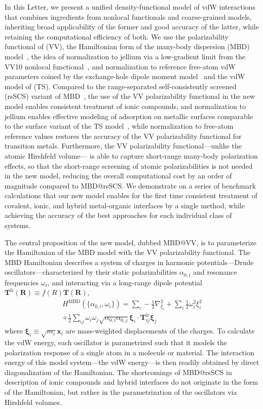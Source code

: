 In this Letter, we present a unified density-functional model of vdW interactions that combines ingredients from nonlocal functionals and coarse-grained models, inheriting broad applicability of the former and good accuracy of the latter, while retaining the computational efficiency of both.
We use the polarizability functional of \citet{VydrovPRA10} (VV), the Hamiltonian form of the many-body dispersion (MBD) model~\citep{TkatchenkoJCP13}, the idea of normalization to jellium via a low-gradient limit from the VV10 nonlocal functional~\citep{VydrovJCP10a}, and normalization to reference free-atom vdW parameters coined by the exchange-hole dipole moment model~\citep{BeckeJCP06} and the vdW model of \citet{TkatchenkoPRL09} (TS).
Compared to the range-separated self-consistently screened (rsSCS) variant of MBD~\citep{AmbrosettiJCP14}, the use of the VV polarizability functional in the new model enables consistent treatment of ionic compounds, and normalization to jellium enables effective modeling of adsorption on metallic surfaces comparable to the surface variant of the TS model~\cite{RuizPRL12}, while normalization to free-atom reference values restores the accuracy of the VV polarizability functional for transition metals.
Furthermore, the VV polarizability functional---unlike the atomic Hirshfeld volume---
is able to capture short-range many-body polarization effects, so that the short-range screening of atomic polarizabilities is not needed in the new model, reducing the overall computational cost by an order of magnitude compared to MBD@rsSCS\@.
We demonstrate on a series of benchmark calculations that our new model enables for the first time consistent treatment of covalent, ionic, and hybrid metal-organic interfaces by a single method, while achieving the accuracy of the best approaches for each individual class of systems.

The central proposition of the new model, dubbed MBD@VV, is to parameterize the Hamiltonian of the MBD model with the VV polarizability functional.
The MBD Hamiltonian describes a system of charges in harmonic potentials---Drude oscillators---characterized by their static polarizabilities $\alpha_{0,i}$ and resonance frequencies $\omega_i$, and interacting via a long-range dipole potential $\mathbf T^\mathrm{lr}(\mathbf R)\equiv f(R)\mathbf T(\mathbf R)$,
\begin{multline}
  H^\text{MBD}(\{\alpha_{0,i},\omega_i\})=\sum_i-\frac12\nabla_{\xi_i}^2+\sum_i\frac12\omega_i^2\xi_i^2 \\
  +\frac12\sum_{ij}\omega_i\omega_j\sqrt{\alpha_{0,i}\alpha_{0,j}}\boldsymbol{\xi}_i\cdot\mathbf T^\mathrm{lr}_{ij}\boldsymbol{\xi}_j
\end{multline}
where $\boldsymbol\xi_i\equiv\sqrt{m_i}\mathbf x_i$ are mass-weighted displacements of the charges.
To calculate the vdW energy, each oscillator is parametrized such that it models the polarization response of a single atom in a molecule or material.
The interaction energy of this model system---the vdW energy---is then readily obtained by direct diagonalization of the Hamiltonian.
The shortcomings of MBD@rsSCS in description of ionic compounds and hybrid interfaces do not originate in the form of the Hamiltonian, but rather in the parametrization of the oscillators via Hirshfeld volumes.

